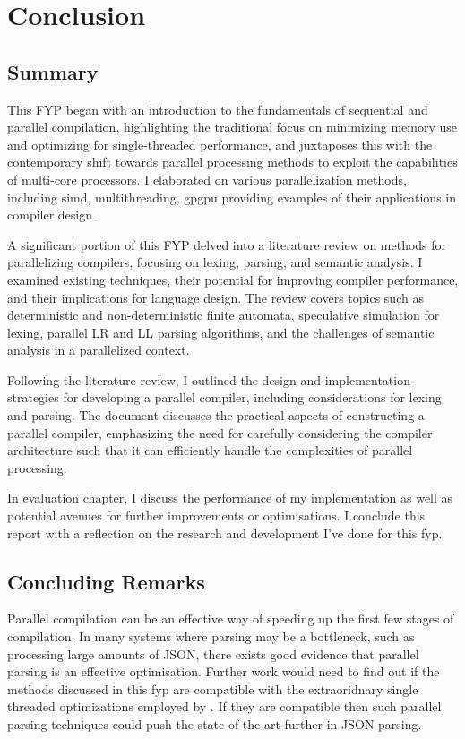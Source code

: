 \chapter{Conclusion} \label{conclusion} 

\section{Summary}

This FYP began with an introduction to the fundamentals of sequential and parallel compilation,
highlighting the traditional focus on minimizing memory use and optimizing for single-threaded
performance, and juxtaposes this with the contemporary shift towards parallel processing methods to
exploit the capabilities of multi-core processors. I elaborated on various parallelization methods,
including \gls{simd}, multithreading, \gls{gpgpu}  providing examples of their applications in
compiler design.

A significant portion of this FYP delved into a literature review on methods for parallelizing
compilers, focusing on lexing, parsing, and semantic analysis. I examined existing techniques, their
potential for improving compiler performance, and their implications for language design. The review
covers topics such as deterministic and non-deterministic finite automata, speculative simulation
for lexing, parallel LR and LL parsing algorithms, and the challenges of semantic analysis in a
parallelized context.

Following the literature review, I outlined the design and implementation strategies for developing
a parallel compiler, including considerations for lexing and parsing. The document discusses
the practical aspects of constructing a parallel compiler, emphasizing the need for carefully
considering the compiler architecture such that it can efficiently handle the complexities of
parallel processing.

In evaluation chapter, I discuss the performance of my implementation as well as potential avenues for further improvements or optimisations. I conclude this report with a reflection on the research and development I've done for this \gls{fyp}.

\section{Concluding Remarks}

Parallel compilation can be an effective way of speeding up the first few stages of compilation.
In many systems where parsing may be a bottleneck, such as processing large amounts of JSON, there exists good evidence that parallel parsing is an effective optimisation. Further work would need to find out if the methods discussed in this \gls{fyp} are compatible with the extraoridnary single threaded optimizations employed by \cite{langdale_parsing_2019}. If they are compatible then such parallel parsing techniques could push the state of the art further in JSON parsing.

